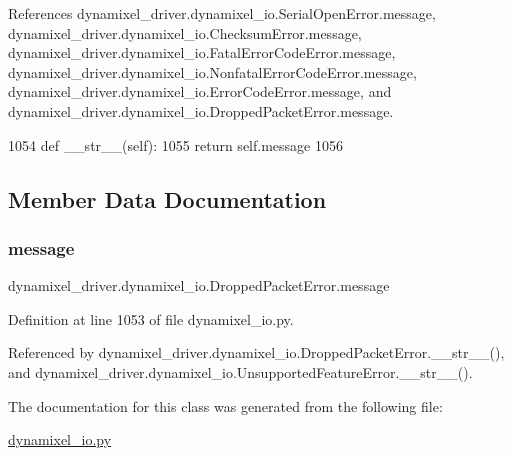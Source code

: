 References dynamixel\+\_\+driver.\+dynamixel\+\_\+io.\+Serial\+Open\+Error.\+message, dynamixel\+\_\+driver.\+dynamixel\+\_\+io.\+Checksum\+Error.\+message, dynamixel\+\_\+driver.\+dynamixel\+\_\+io.\+Fatal\+Error\+Code\+Error.\+message, dynamixel\+\_\+driver.\+dynamixel\+\_\+io.\+Nonfatal\+Error\+Code\+Error.\+message, dynamixel\+\_\+driver.\+dynamixel\+\_\+io.\+Error\+Code\+Error.\+message, and dynamixel\+\_\+driver.\+dynamixel\+\_\+io.\+Dropped\+Packet\+Error.\+message.


\begin{DoxyCode}
1054     \textcolor{keyword}{def }\_\_str\_\_(self):
1055         \textcolor{keywordflow}{return} self.message
1056 
\end{DoxyCode}


\subsection{Member Data Documentation}
\mbox{\label{classdynamixel__driver_1_1dynamixel__io_1_1_dropped_packet_error_a2fd7e42caadb7767233d228304a0f725}} 
\subsubsection{\texorpdfstring{message}{message}}
{\footnotesize\ttfamily dynamixel\+\_\+driver.\+dynamixel\+\_\+io.\+Dropped\+Packet\+Error.\+message}



Definition at line 1053 of file dynamixel\+\_\+io.\+py.



Referenced by dynamixel\+\_\+driver.\+dynamixel\+\_\+io.\+Dropped\+Packet\+Error.\+\_\+\+\_\+str\+\_\+\+\_\+(), and dynamixel\+\_\+driver.\+dynamixel\+\_\+io.\+Unsupported\+Feature\+Error.\+\_\+\+\_\+str\+\_\+\+\_\+().



The documentation for this class was generated from the following file\+:\begin{DoxyCompactItemize}
\item 
\hyperlink{dynamixel__io_8py}{dynamixel\+\_\+io.\+py}\end{DoxyCompactItemize}
